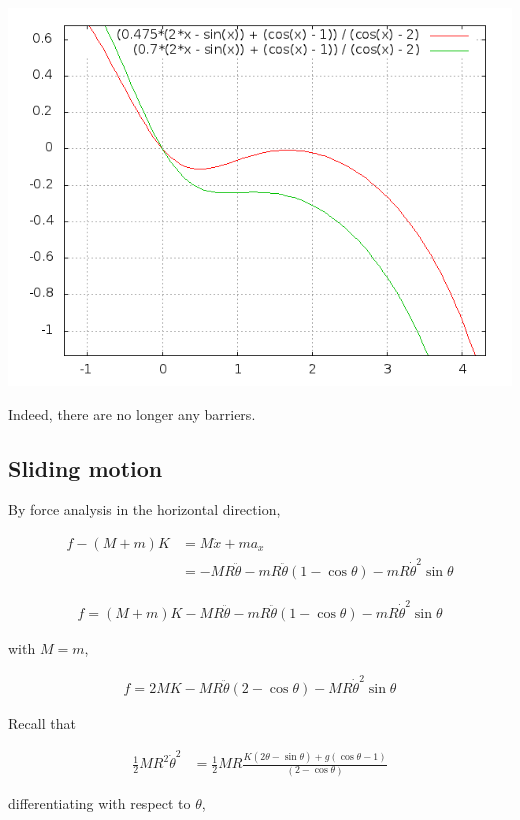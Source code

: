 \documentclass{article}
\newcommand{\half}{\frac{1}{2}}
\begin{document}
\includegraphics[width=\textwidth]{4A2.png}

Indeed, there are no longer any barriers.

\subsection{Sliding motion}

By force analysis in the horizontal direction,

\begin{align*}
f - (M+m)K &= M\ddot{x} + ma_x \\
&= - MR\ddot\theta - mR\ddot\theta(1 - \cos\theta) - mR\dot\theta^2\sin\theta
\end{align*}

\begin{align*}
f = (M+m)K - MR\ddot\theta - mR\ddot\theta(1 - \cos\theta) - mR\dot\theta^2\sin\theta
\end{align*}

with $M = m$,

\begin{align*}
f = 2MK - MR\ddot\theta(2 - \cos\theta) - MR\dot\theta^2\sin\theta
\end{align*}

Recall that 

\begin{align*}
\half MR^2 \dot{\theta}^2 &= \half MR \frac{K(2\theta - \sin\theta)+ g(\cos\theta - 1)}{(2 - \cos\theta)}
\end{align*}

differentiating with respect to $\theta$,
\end{document}
